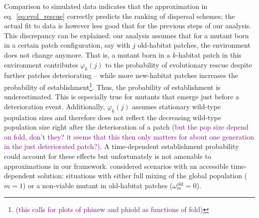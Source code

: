 \documentclass[11pt]{article}
\newcommand{\florence}[1]{\textcolor{purple}{(#1)}} %
\begin{document}
Comparison to simulated data indicates that the approximation in eq.~\eqref{eq:evol_rescue} correctly predicts the  ranking of dispersal schemes; the actual fit to data is however less good that for the previous steps of our analysis. This discrepancy can be explained: our analysis assumes that for a mutant born in a certain patch configuration, say with $j$ old-habitat patches, the environment does not change anymore. That is, a mutant born in a $k$-habitat patch in this environment contributes $\varphi_{k}(j)$ to the probability of evolutionary rescue despite further patches deteriorating -- while more new-habitat patches increases the probability of establishment\footnote{\florence{this calls for plots of phinew and phiold as functions of fold}}. Thus, the probability of establishment is underestimated. This is especially true for mutants that emerge just before a deterioration event. Additionally, $\varphi_k(j)$ assumes stationary wild-type population sizes and therefore does not reflect the decreasing wild-type population size right after the deterioration of a patch \florence{but the pop size depend on fold, don't they? it seems that this then only matters for about one generation in the just deteriorated patch?}.
A time-dependent establishment probability could account for these effects but unfortunately is not amenable to approximations in our framework.
 considered scenarios with an accessible time-dependent solution: situations with either full mixing of the global population ($m=1$) or a non-viable mutant in old-habitat patches ($\omega^\text{old}_m=0$).
\end{document}
